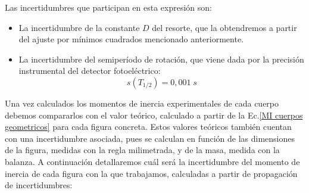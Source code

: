 \documentclass[a4paper,12pt,titlepage]{article}
\begin{document}
Las incertidumbres que participan en esta expresión son:

\begin{itemize}
    \item La incertidumbre de la constante $D$ del resorte, que la obtendremos a partir del ajuste por mínimos cuadrados mencionado anteriormente.
    \item La incertidumbre del semiperíodo de rotación, que viene dada por la precisión instrumental del detector fotoeléctrico:
    \begin{equation}
        s(T_{1/2}) = 0,001 \;s
    \end{equation}
\end{itemize}

Una vez calculados los momentos de inercia experimentales de cada cuerpo debemos compararlos con el valor teórico, calculado a partir de la Ec.\ref{MI cuerpos geometricos} para cada figura concreta. Estos valores teóricos también cuentan con una incertidumbre asociada, pues se calculan en función de las dimensiones de la figura, medidas con la regla milimetrada, y de la masa, medida con la balanza. A continuación detallaremos cuál será la incertidumbre del momento de inercia de cada figura con la que trabajamos, calculadas a partir de propagación de incertidumbres:
\end{document}
